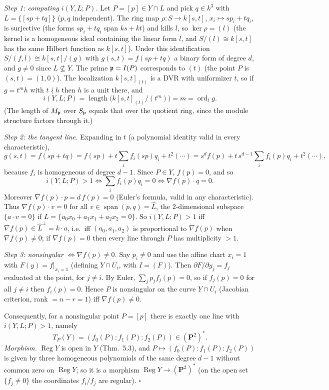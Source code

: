 \documentclass[11pt]{article}
\begin{document}
\emph{Step 1: computing $i(Y,L;P)$.} Let $P=[p]\in Y\cap L$ and pick $q\in k^3$ with $L=\{[sp+tq]\}$ ($p,q$ independent). The ring map $\rho:S\to k[s,t]$, $x_i\mapsto sp_i+tq_i$, is surjective (the forms $sp_i+tq_i$ span $ks+kt$) and kills $l$, so $\ker\rho=(l)$ (the kernel is a homogeneous ideal containing the linear form $l$, and $S/(l)\cong k[s,t]$ has the same Hilbert function as $k[s,t]$). Under this identification $S/(f,l)\cong k[s,t]/(g)$ with $g(s,t)=f(sp+tq)$ a binary form of degree $d$, and $g\ne0$ since $L\not\subseteq Y$. The prime $\mathfrak p=I(P)$ corresponds to $(t)$ (the point $P$ is $(s,t)=(1,0)$). The localization $k[s,t]_{(t)}$ is a DVR with uniformizer $t$, so if $g=t^mh$ with $t\nmid h$ then $h$ is a unit there, and
\[
i(Y,L;P)=\operatorname{length}\big(k[s,t]_{(t)}/(t^m)\big)=m=\operatorname{ord}_t g.
\]
(The length of $M_\mathfrak p$ over $S_\mathfrak p$ equals that over the quotient ring, since the module structure factors through it.)

\emph{Step 2: the tangent line.} Expanding in $t$ (a polynomial identity valid in every characteristic),
\[
g(s,t)=f(sp+tq)=f(sp)+t\sum_i f_i(sp)q_i+t^2(\cdots)=s^df(p)+t\,s^{d-1}\sum_if_i(p)q_i+t^2(\cdots),
\]
because $f_i$ is homogeneous of degree $d-1$. Since $P\in Y$, $f(p)=0$, and so
\[
i(Y,L;P)>1\iff\sum_if_i(p)q_i=0 \iff \nabla f(p)\cdot q=0.
\]
Moreover $\nabla f(p)\cdot p=d\,f(p)=0$ (Euler's formula, valid in any characteristic). Thus $\nabla f(p)\cdot v=0$ for all $v\in\operatorname{span}(p,q)=\hat L$, the $2$-dimensional subspace $\{a\cdot v=0\}$ if $L=\{a_0x_0+a_1x_1+a_2x_2=0\}$. So $i(Y,L;P)>1$ iff $\nabla f(p)\in\hat L^{\perp}=k\cdot a$, i.e.\ iff $(a_0,a_1,a_2)$ is proportional to $\nabla f(p)$ when $\nabla f(p)\ne0$; if $\nabla f(p)=0$ then every line through $P$ has multiplicity $>1$.

\emph{Step 3: nonsingular $\iff\nabla f(p)\ne0$.} Say $p_i\ne0$ and use the affine chart $x_i=1$ with $F(y)=f|_{x_i=1}$ (defining $Y\cap U_i$, with $I=(F)$). Then $\partial F/\partial y_j=f_j$ evaluated at the point, for $j\ne i$. By Euler, $\sum_jp_jf_j(p)=0$, so if $f_j(p)=0$ for all $j\ne i$ then $f_i(p)=0$. Hence $P$ is nonsingular on the curve $Y\cap U_i$ (Jacobian criterion, rank $=n-r=1$) iff $\nabla f(p)\ne0$.

Consequently, for a nonsingular point $P=[p]$ there is exactly one line with $i(Y,L;P)>1$, namely
\[
T_P(Y)=(f_0(P):f_1(P):f_2(P))\in(\mathbf P^2)^*.
\]
\emph{Morphism.} $\operatorname{Reg}Y$ is open in $Y$ (Thm.~5.3), and $P\mapsto(f_0(P):f_1(P):f_2(P))$ is given by three homogeneous polynomials of the same degree $d-1$ without common zero on $\operatorname{Reg}Y$; so it is a morphism $\operatorname{Reg}Y\to(\mathbf P^2)^*$ (on the open set $\{f_j\neq0\}$ the coordinates $f_i/f_j$ are regular). \hfill$\square$
\end{document}
